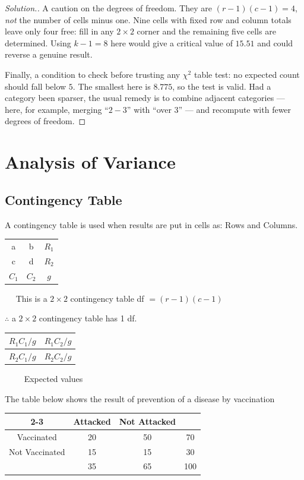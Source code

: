 \documentclass[11pt,a4paper]{article}
\theoremstyle{definition}
\newenvironment{solution}
  {\renewcommand{\qedsymbol}{}\begin{proof}[\textit{Solution}.]}
  {\end{proof}}
\begin{document}
\begin{solution}
A caution on the degrees of freedom. They are $(r-1)(c-1)=4$, \emph{not} the number of cells
minus one. Nine cells with fixed row and column totals leave only four free: fill in any
$2\times 2$ corner and the remaining five cells are determined. Using $k-1=8$ here would
give a critical value of $15.51$ and could reverse a genuine result.

Finally, a condition to check before trusting any $\chi^2$ table test: no expected count
should fall below $5$. The smallest here is $8.775$, so the test is valid. Had a category
been sparser, the usual remedy is to combine adjacent categories --- here, for example,
merging ``$2-3$'' with ``over 3'' --- and recompute with fewer degrees of freedom.
\end{solution}


\section{Analysis of Variance}
\subsection{Contingency Table }
A contingency table is used when results are put in cells as: Rows and Columns.

\begin{table}[H]
\centering
\begin{tabular}{|c|c|c}
\hline a&b& $R_1$\\
c&d&$R_2$\\
\hline $C_1$& $C_2$ &$g$
\end{tabular}
$\quad $ This is a $2\times 2$ contingency table df $=(r-1)(c-1)$\\
\end{table}

$\therefore$ a $2\times 2$ contingency table has 1 df.\\

\begin{table}[H]
\centering
\begin{tabular}{|c|c|}
\hline $R_1C_1/g$ & $R_1C_2/g$\\
\hline $R_2C_1/g$ & $R_2C_2/g$\\
\hline
\end{tabular}
$\qquad $ Expected values\\
\end{table}



The table below shows the result of prevention of a disease by vaccination
\begin{table}[H]
\centering
\begin{tabular}{c|c|c|c}
\cline{2-3}
 & Attacked & Not Attacked &\\
\hline Vaccinated & 20 & 50 & 70\\
Not Vaccinated & 15 & 15 & 30\\
\hline & 35 & 65 & 100\\
\end{tabular}
\end{table}
\end{document}
